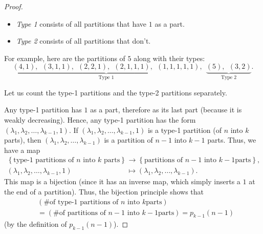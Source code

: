 \begin{proof}
\begin{itemize}
\item \emph{Type 1} consists of all partitions that have $1$ as a part.

\item \emph{Type 2} consists of all partitions that don't.
\end{itemize}

For example, here are the partitions of $5$ along with their types:%
\[
\underbrace{\left(  4,1\right)  ,\ \ \left(  3,1,1\right)  ,\ \ \left(
2,2,1\right)  ,\ \ \left(  2,1,1,1\right)  ,\ \ \left(  1,1,1,1,1\right)
}_{\text{Type 1}},\ \ \underbrace{\left(  5\right)  ,\ \ \left(  3,2\right)
}_{\text{Type 2}}.
\]


Let us count the type-1 partitions and the type-2 partitions separately.

Any type-1 partition has $1$ as a part, therefore as its last part (because it
is weakly decreasing). Hence, any type-1 partition has the form $\left(
\lambda_{1},\lambda_{2},\ldots,\lambda_{k-1},1\right)  $. If $\left(
\lambda_{1},\lambda_{2},\ldots,\lambda_{k-1},1\right)  $ is a type-1 partition
(of $n$ into $k$ parts), then $\left(  \lambda_{1},\lambda_{2},\ldots
,\lambda_{k-1}\right)  $ is a partition of $n-1$ into $k-1$ parts. Thus, we
have a map%
\begin{align*}
\left\{  \text{type-1 partitions of }n\text{ into }k\text{ parts}\right\}   &
\rightarrow\left\{  \text{partitions of }n-1\text{ into }k-1\text{
parts}\right\}  ,\\
\left(  \lambda_{1},\lambda_{2},\ldots,\lambda_{k-1},1\right)   &
\mapsto\left(  \lambda_{1},\lambda_{2},\ldots,\lambda_{k-1}\right)  .
\end{align*}
This map is a bijection (since it has an inverse map, which simply inserts a
$1$ at the end of a partition). Thus, the bijection principle shows that%
\begin{align*}
&  \left(  \text{\# of type-1 partitions of }n\text{ into }k\text{
parts}\right) \\
&  =\left(  \text{\# of partitions of }n-1\text{ into }k-1\text{
parts}\right)  =p_{k-1}\left(  n-1\right)
\end{align*}
(by the definition of $p_{k-1}\left(  n-1\right)  $).


\end{proof}
